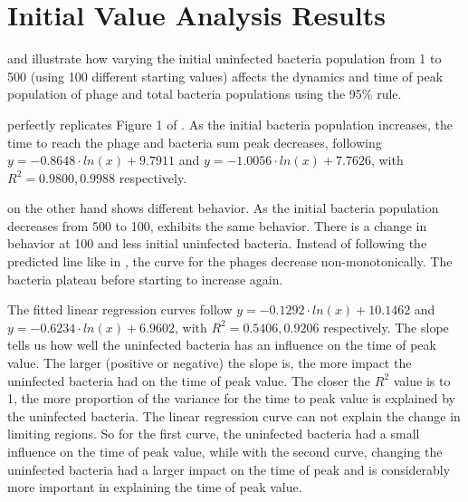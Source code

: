 \section{Initial Value Analysis Results}
\label{sec:results:initial_value_analysis}
 and  illustrate how varying the initial uninfected bacteria population from 1 to 500 (using 100 different starting values) affects the dynamics and time of peak population of phage and total bacteria populations using the 95\% rule. 

 perfectly replicates Figure 1 of \citet{mullaExtremeDiversityPhage2024}. 
As the initial bacteria population increases, the time to reach the phage and bacteria sum peak decreases, following $y = -0.8648\cdot ln(x) + 9.7911$ and $y = -1.0056\cdot ln(x)+7.7626$, with $R^2=0.9800, 0.9988$ respectively. 

 on the other hand shows different behavior. 
As the initial bacteria population decreases from 500 to 100,  exhibits the same behavior. 
There is a change in behavior at 100 and less initial uninfected bacteria. 
Instead of following the predicted line like in , the curve for the phages decrease non-monotonically.
The bacteria plateau before starting to increase again. 

The fitted linear regression curves follow $y = -0.1292\cdot ln(x) + 10.1462$ and $y = -0.6234\cdot ln(x)+6.9602$, with $R^2=0.5406, 0.9206$ respectively. 
The slope tells us how well the uninfected bacteria has an influence on the time of peak value. 
The larger (positive or negative) the slope is, the more impact the uninfected bacteria had on the time of peak value. 
The closer the $R^2$ value is to 1, the more proportion of the variance for the time to peak value is explained by the uninfected bacteria. 
The linear regression curve can not explain the change in limiting regions. 
So for the first curve, the uninfected bacteria had a small influence on the time of peak value, while with the second curve, changing the uninfected bacteria had a larger impact on the time of peak and is considerably more important in explaining the time of peak value. 

